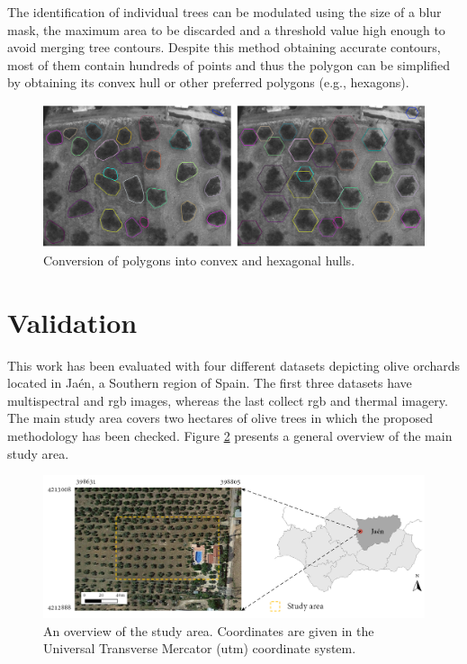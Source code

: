 The identification of individual trees can be modulated using the size of a blur mask, the maximum area to be discarded and a threshold value high enough to avoid merging tree contours. Despite this method obtaining accurate contours, most of them contain hundreds of points and thus the polygon can be simplified by obtaining its convex hull \cite{sklansky_finding_1982} or other preferred polygons (e.g., hexagons). 

\begin{figure}[hbp]
    \centering
    \includegraphics[width=1\linewidth]{figs/image_fusion/convex_hull_contours.png}
    \caption{Conversion of polygons into convex and hexagonal hulls.}
    \label{fig:convex_hull_contours}
\end{figure}

\section{Validation}
\label{sec:image_fusion_evaluation}

This work has been evaluated with four different datasets depicting olive orchards located in Jaén, a Southern region of Spain. The first three datasets have multispectral and \acrshort{rgb} images, whereas the last collect \acrshort{rgb} and thermal imagery. The main study area covers two hectares of olive trees in which the proposed methodology has been checked. Figure \ref{fig:image_fusion_study_area} presents a general overview of the main study area.

\begin{figure}[htb]
    \centering
    \includegraphics{figs/image_fusion/study_area.png}
    \caption{An overview of the study area. Coordinates are given in the Universal Transverse Mercator (\acrshort{utm}) coordinate system.}
    \label{fig:image_fusion_study_area}
\end{figure}

